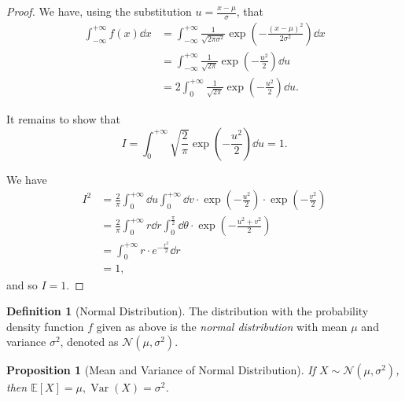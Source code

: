 \documentclass[11pt]{article}
\numberwithin{equation}{section}
\newtheorem{proposition}[theorem]{Proposition}
\theoremstyle{definition}
\newtheorem{definition}[theorem]{Definition}
\theoremstyle{remark}
\newcommand{\pqty}[1]{\left(#1\right)}
\newcommand{\bqty}[1]{\left[#1\right]}
\newcommand{\plusinfty}{+\infty}
\newcommand{\minusinfty}{-\infty}
\newcommand{\Expt}{\mathbb E}
\DeclareMathOperator{\Var}{Var}
\newcommand{\Normal}{\mathcal N}
\begin{document}
\begin{proof}\label{probability-proof-064}
    We have, using the substitution \(u = \frac{x - \mu}{\sigma}\), that
    \begin{align*}
        \int_{\minusinfty}^{\plusinfty} f\pqty{x} \dd{x} &= \int_{\minusinfty}^{\plusinfty} \frac{1}{\sqrt{2 \pi \sigma^2}} \exp\pqty{-\frac{\pqty{x - \mu}^2}{2 \sigma^2}} \dd{x} \\
        &= \int_{\minusinfty}^{\plusinfty} \frac{1}{\sqrt{2 \pi}} \exp\pqty{- \frac{u^2}{2}} \dd{u} \\
        &= 2 \int_{0}^{\plusinfty} \frac{1}{\sqrt{2 \pi}} \exp\pqty{- \frac{u^2}{2}} \dd{u}.
    \end{align*}

    It remains to show that
    \[
        I = \int_{0}^{\plusinfty} \sqrt{\frac{2}{\pi}} \exp\pqty{- \frac{u^2}{2}} \dd{u} = 1.
    \]

    We have
    \begin{align*}
        I^2 &= \frac{2}{\pi} \int_{0}^{\plusinfty} \dd{u} \int_{0}^{\plusinfty} \dd{v} \cdot \exp\pqty{- \frac{u^2}{2}} \cdot \exp\pqty{- \frac{v^2}{2}} \\
        &= \frac{2}{\pi} \int_{0}^{\plusinfty} r \dd{r} \int_{0}^{\frac{\pi}{2}} \dd{\theta} \cdot \exp\pqty{- \frac{u^2 + v^2}{2}} \\
        &= \int_{0}^{\plusinfty} r \cdot e^{-\frac{r^2}{2}} \dd{r} \\
        &= 1,
    \end{align*}
    and so \(I = 1\).
\end{proof}

\begin{definition}[Normal Distribution]\label{probability-definition-048}
    \label{probability-def:normal}%
    The distribution with the probability density function \(f\) given as above is the \emph{normal distribution} with mean \(\mu\) and variance \(\sigma^2\), denoted as \(\Normal\pqty{\mu, \sigma^2}\).
\end{definition}

\begin{proposition}[Mean and Variance of Normal Distribution]\label{probability-proposition-035}
    \label{probability-prop:mean-variance-normal}%
    If \(X \sim \Normal\pqty{\mu, \sigma^2}\), then \(\Expt\bqty{X} = \mu, \Var\pqty{X} = \sigma^2\).
\end{proposition}
\end{document}
